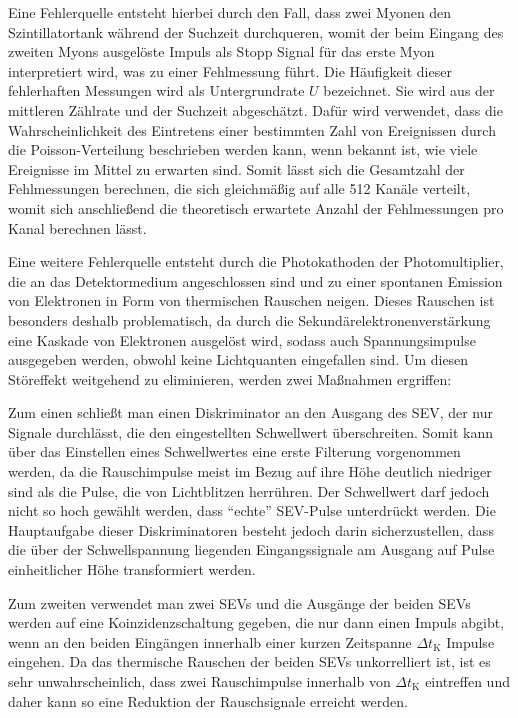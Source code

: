 Eine Fehlerquelle entsteht hierbei durch den Fall, dass zwei Myonen den Szin\-tillator\-tank während der Suchzeit durchqueren, womit der beim Eingang des zweiten Myons ausgelöste Impuls als Stopp Signal für das erste Myon interpretiert wird, was zu einer Fehlmessung führt. Die Häufigkeit dieser fehlerhaften Messungen wird als Untergrundrate $U$ bezeichnet. Sie wird aus der mittleren Zählrate und der Suchzeit abgeschätzt. Dafür wird verwendet, dass die Wahrscheinlichkeit des Eintretens einer bestimmten Zahl von Ereignissen durch die Poisson-Verteilung beschrieben werden kann, wenn bekannt ist, wie viele Ereignisse im Mittel zu erwarten sind. Somit lässt sich die Gesamtzahl der Fehlmessungen berechnen, die sich gleichmäßig auf alle 512 Kanäle verteilt, womit sich anschließend die theoretisch erwartete Anzahl der Fehlmessungen pro Kanal berechnen lässt.

Eine weitere Fehlerquelle entsteht durch die Photokathoden der Photomultiplier, die an das Detektormedium angeschlossen sind und zu einer spontanen Emission von Elektronen in Form von thermischen Rauschen neigen. Dieses Rauschen ist besonders deshalb problematisch, da durch die Sekundärelektronenverstärkung eine Kaskade von Elektronen ausgelöst wird, sodass auch Spannungsimpulse ausgegeben werden, obwohl keine Lichtquanten eingefallen sind. Um diesen Störeffekt weitgehend zu eliminieren, werden zwei Maßnahmen ergriffen:

Zum einen schließt man einen Diskriminator an den Ausgang des SEV, der nur Signale durchlässt, die den eingestellten Schwellwert überschreiten. Somit kann über das Einstellen eines Schwellwertes eine erste Filterung vorgenommen werden, da die Rauschimpulse meist im Bezug auf ihre Höhe deutlich niedriger sind als die Pulse, die von Lichtblitzen herrühren. Der Schwellwert darf jedoch nicht so hoch gewählt werden, dass "`echte"' SEV-Pulse unterdrückt werden. Die Hauptaufgabe dieser Diskriminatoren besteht jedoch darin sicherzustellen, dass die über der Schwellspannung liegenden Eingangssignale am Ausgang auf Pulse einheitlicher Höhe transformiert werden.

Zum zweiten verwendet man zwei SEVs und die Ausgänge der beiden SEVs werden auf eine Koinzidenzschaltung gegeben, die nur dann einen Impuls abgibt, wenn an den beiden Eingängen innerhalb einer kurzen Zeitspanne $\Delta t_{\textrm{K}}$ Impulse eingehen. Da das thermische Rauschen der beiden SEVs unkorrelliert ist, ist es sehr unwahrscheinlich, dass zwei Rauschimpulse innerhalb von $\Delta t_{\textrm{K}}$ eintreffen und daher kann so eine Reduktion der Rauschsignale erreicht werden.

